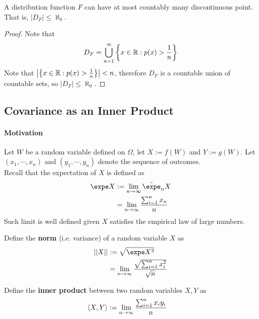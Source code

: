 \documentclass{article}
\begin{document}
   	\begin{theorem}
   		A distribution function $F$ can have at most countably many discontinuous point. That is, $|D_F| \leq \aleph_0$.
   	\end{theorem}
   	
   	\begin{proof}
   		Note that
   		\begin{align}
   			D_F = \bigcup_{n=1}^\infty \left\{x\in \mathbb{R}: p(x) > \frac{1}{n}\right\}
   		\end{align}
   		Note that $\big \vert {\left\{x\in \mathbb{R}: p(x) > \frac{1}{n}\right\}} \big \vert < n$, therefore $D_F$ is a countable union of countable sets, so $|D_F| \leq \aleph_0$.
   	\end{proof}
   	
   	\subsection{Covariance as an Inner Product}
   	\paragraph{Motivation} Let $W$ be a random variable defined on $\Omega$, let $X := f(W)$ and $Y := g(W)$. Let $(x_1, \cdots, x_n)$ and $(y_1, \cdots, y_n)$ denote the sequence of outcomes. \\
   	Recall that the expectation of $X$ is defined as
   	\begin{align}
   		\expe X &:= \lim_{n \to \infty} \hat{\expe}_n X \\
   		&= \lim_{n \to \infty} \frac{\sum_{i=1}^n x_n}{n}
   	\end{align}
   	Such limit is well defined given $X$ satisfies the empirical law of large numbers.
   	
   	\begin{definition}
   		Define the \textbf{norm} (i.e. variance) of a random variable $X$ as 
   		\begin{align}
   			\norm{X} &:= \sqrt{\expe X^2} \\
   			&= \lim_{n \to \infty} \frac{\sqrt{\sum_{i=1}^n x_i^2}}{\sqrt{n}}
   		\end{align}
   	\end{definition}
   	\begin{definition}
   		Define the \textbf{inner product} between two random variables $X, Y$ as 
   		\begin{align}
   			\langle {X}, {Y} \rangle &:= \lim_{n \to \infty} \frac{\sum_{i=1}^n x_i y_i}{n}
   		\end{align}
   	\end{definition}
   	
\end{document}
